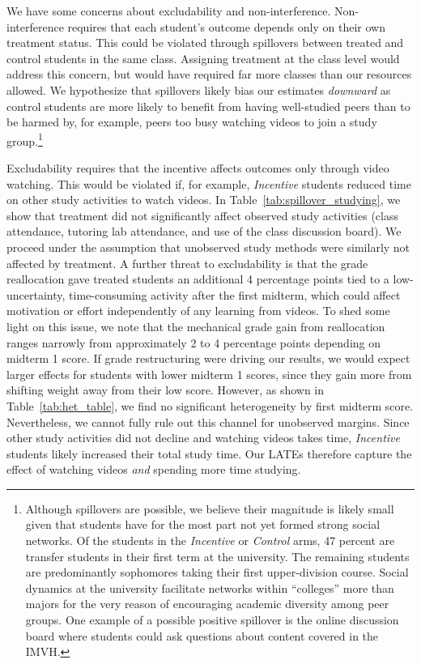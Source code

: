 We have some concerns about excludability and non-interference.
Non-interference requires that each student's outcome depends only on their own treatment status.
This could be violated through spillovers between treated and control students in the same class.
Assigning treatment at the class level would address this concern, but would have required far more classes than our resources allowed.
We hypothesize that spillovers likely bias our estimates \textit{downward} as control students are more likely to benefit from having well-studied peers than to be harmed by, for example, peers too busy watching videos to join a study group.\footnote{Although spillovers are possible, we believe their magnitude is likely small given that students have for the most part not yet formed strong social networks. Of the students in the \textit{Incentive} or \textit{Control} arms, 47 percent are transfer students in their first term at the university.
The remaining students are predominantly sophomores taking their first upper-division course.
Social dynamics at the university facilitate networks within ``colleges'' more than majors for the very reason of encouraging academic diversity among peer groups.
One example of a possible positive spillover is the online discussion board where students could ask questions about content covered in the IMVH.
}

Excludability requires that the incentive affects outcomes only through video watching.
This would be violated if, for example, \textit{Incentive} students reduced time on other study activities to watch videos.
In Table~\ref{tab:spillover_studying}, we show that treatment did not significantly affect observed study activities (class attendance, tutoring lab attendance, and use of the class discussion board).
We proceed under the assumption that unobserved study methods were similarly not affected by treatment.
A further threat to excludability is that the grade reallocation gave treated students an additional 4 percentage points tied to a low-uncertainty, time-consuming activity after the first midterm, which could affect motivation or effort independently of any learning from videos.
To shed some light on this issue, we note that the mechanical grade gain from reallocation ranges narrowly from approximately 2 to 4 percentage points depending on midterm 1 score.
If grade restructuring were driving our results, we would expect larger effects for students with lower midterm 1 scores, since they gain more from shifting weight away from their low score.
However, as shown in Table~\ref{tab:het_table}, we find no significant heterogeneity by first midterm score.
Nevertheless, we cannot fully rule out this channel for unobserved margins.
Since other study activities did not decline and watching videos takes time, \textit{Incentive} students likely increased their total study time.
Our LATEs therefore capture the effect of watching videos \textit{and} spending more time studying.

